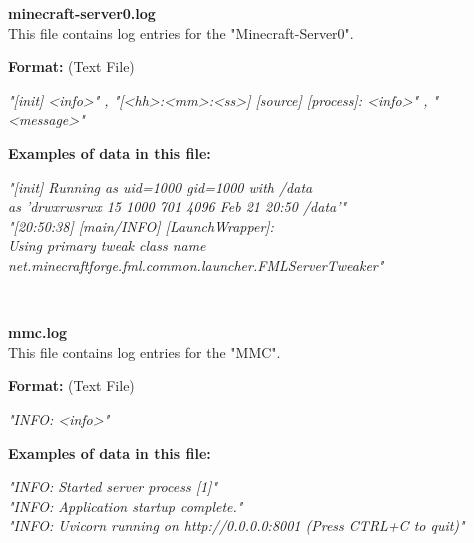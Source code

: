 \begin{description}
\begin{addmargin}[0em]{0em}
    \label{minecraft-server0.log}
    \begin{addmargin}[1em]{0em} %
        \textbf{minecraft-server0.log}\\
        This file contains log entries for the "Minecraft-Server0".
        \begin{addmargin}[1em]{0em}
            \textbf{Format:} (Text File)
            \begin{addmargin}[1em]{0em}
                \textit{"[init] <info>" , "[<hh>:<mm>:<ss>] [source] [process]: <info>" , "<message>"}
            \end{addmargin}
        \end{addmargin}
        \begin{addmargin}[1em]{0em}
            \textbf{Examples of data in this file:}
            \begin{addmargin}[1em]{0em}\textit{"[init] Running as uid=1000 gid=1000 with /data\\ as 'drwxrwsrwx 15 1000 701 4096 Feb 21 20:50 /data'"\\
                "[20:50:38] [main/INFO] [LaunchWrapper]:\\ Using primary tweak class name net.minecraftforge.fml.common.launcher.FMLServerTweaker"}
            \end{addmargin}
        \end{addmargin}
    \end{addmargin} %
    \textbf{\\}

    \label{mmc.log}
    \begin{addmargin}[1em]{0em} %
        \textbf{mmc.log}\\
        This file contains log entries for the "MMC".
        \begin{addmargin}[1em]{0em}
            \textbf{Format:} (Text File)
            \begin{addmargin}[1em]{0em}
                \textit{"INFO: <info>"}
            \end{addmargin}
        \end{addmargin}
        \begin{addmargin}[1em]{0em}
            \textbf{Examples of data in this file:}
            \begin{addmargin}[1em]{0em}\textit{"INFO: Started server process [1]"\\
                "INFO: Application startup complete."\\
                "INFO: Uvicorn running on http://0.0.0.0:8001 (Press CTRL+C to quit)"}
            \end{addmargin}
        \end{addmargin}
    \end{addmargin} %
    \textbf{\\}


\end{addmargin}
\end{description}

